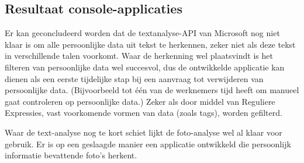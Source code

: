 \subsection{Resultaat console-applicaties}
Er kan geconcludeerd worden dat de textanalyse-API van Microsoft nog niet klaar is om alle persoonlijke data uit tekst te herkennen, zeker niet als deze tekst in verschillende talen voorkomt.
Waar de herkenning wel plaatsvindt is het filteren van persoonlijke data wel succesvol, dus de ontwikkelde applicatie kan dienen als een eerste tijdelijke stap bij een aanvraag tot verwijderen van persoonlijke data. (Bijvoorbeeld tot één van de werknemers tijd heeft om manueel gaat controleren op persoonlijke data.) 
Zeker als door middel van Reguliere Expressies, vast voorkomende vormen van data (zoals tags), worden gefilterd. 

Waar de text-analyse nog te kort schiet lijkt de foto-analyse wel al klaar voor gebruik. Er is op een geslaagde manier een applicatie ontwikkeld die persoonlijk informatie bevattende foto's herkent. 


